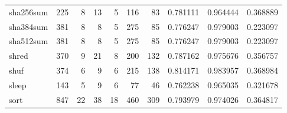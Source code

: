 \begin{longtable}{lrrrrrrrrr}
sha256sum &                    225 &                                  8 &                                13 &                                5 &                               116 &                              83 &                                0.781111 &                               0.964444 &                             0.368889 \\
sha384sum &                    381 &                                  8 &                                 8 &                                5 &                               275 &                              85 &                                0.776247 &                               0.979003 &                             0.223097 \\
sha512sum &                    381 &                                  8 &                                 8 &                                5 &                               275 &                              85 &                                0.776247 &                               0.979003 &                             0.223097 \\
shred     &                    370 &                                  9 &                                21 &                                8 &                               200 &                             132 &                                0.787162 &                               0.975676 &                             0.356757 \\
shuf      &                    374 &                                  6 &                                 9 &                                6 &                               215 &                             138 &                                0.814171 &                               0.983957 &                             0.368984 \\
sleep     &                    143 &                                  5 &                                 9 &                                6 &                                77 &                              46 &                                0.762238 &                               0.965035 &                             0.321678 \\
sort      &                    847 &                                 22 &                                38 &                               18 &                               460 &                             309 &                                0.793979 &                               0.974026 &                             0.364817 \\

\end{longtable}
